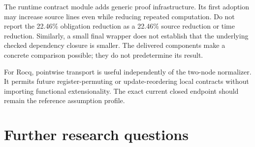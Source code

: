 \documentclass[11pt,letterpaper]{article}
\theoremstyle{definition}
\begin{document}
The runtime contract module adds generic proof infrastructure. Its first
adoption may increase source lines even while reducing repeated computation.
Do not report the 22.46\% obligation reduction as a 22.46\% source reduction
or time reduction. Similarly, a small final wrapper does not establish that
the underlying checked dependency closure is smaller. The delivered components
make a concrete comparison possible; they do not predetermine its result.

For Rocq, pointwise transport is useful independently of the two-node
normalizer. It permits future register-permuting or update-reordering local
contracts without importing functional extensionality. The exact current
closed endpoint should remain the reference assumption profile.

\section{Further research questions}
\end{document}
